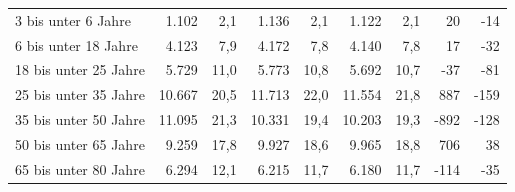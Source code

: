 \documentclass[
  a4paper,
  twoside]{article}
\begin{document}
\begin{table}[!h]
{\begin{threeparttable}
\begin{tabular}[t]{>{}l>{}r>{}r>{}r>{}r>{}r>{}r>{}r>{}r}
\hspace{1em}\hspace{1em}\textcolor{DoGray}{3 bis unter 6 Jahre} & \textcolor{DoGray}{1.102} & \textcolor{DoGray}{2,1} & \textcolor{DoGray}{1.136} & \textcolor{DoGray}{2,1} & \textcolor{DoGray}{1.122} & \textcolor{DoGray}{2,1} & \textcolor{DoGray}{20} & \textcolor{DoGray}{-14}\\
\hspace{1em}\hspace{1em}\textcolor{DoGray}{6 bis unter 18 Jahre} & \textcolor{DoGray}{4.123} & \textcolor{DoGray}{7,9} & \textcolor{DoGray}{4.172} & \textcolor{DoGray}{7,8} & \textcolor{DoGray}{4.140} & \textcolor{DoGray}{7,8} & \textcolor{DoGray}{17} & \textcolor{DoGray}{-32}\\
\hspace{1em}\hspace{1em}\textcolor{DoGray}{18 bis unter 25 Jahre} & \textcolor{DoGray}{5.729} & \textcolor{DoGray}{11,0} & \textcolor{DoGray}{5.773} & \textcolor{DoGray}{10,8} & \textcolor{DoGray}{5.692} & \textcolor{DoGray}{10,7} & \textcolor{DoGray}{-37} & \textcolor{DoGray}{-81}\\
\hspace{1em}\hspace{1em}\textcolor{DoGray}{25 bis unter 35 Jahre} & \textcolor{DoGray}{10.667} & \textcolor{DoGray}{20,5} & \textcolor{DoGray}{11.713} & \textcolor{DoGray}{22,0} & \textcolor{DoGray}{11.554} & \textcolor{DoGray}{21,8} & \textcolor{DoGray}{887} & \textcolor{DoGray}{-159}\\
\hspace{1em}\hspace{1em}\textcolor{DoGray}{35 bis unter 50 Jahre} & \textcolor{DoGray}{11.095} & \textcolor{DoGray}{21,3} & \textcolor{DoGray}{10.331} & \textcolor{DoGray}{19,4} & \textcolor{DoGray}{10.203} & \textcolor{DoGray}{19,3} & \textcolor{DoGray}{-892} & \textcolor{DoGray}{-128}\\
\hspace{1em}\hspace{1em}\textcolor{DoGray}{50 bis unter 65 Jahre} & \textcolor{DoGray}{9.259} & \textcolor{DoGray}{17,8} & \textcolor{DoGray}{9.927} & \textcolor{DoGray}{18,6} & \textcolor{DoGray}{9.965} & \textcolor{DoGray}{18,8} & \textcolor{DoGray}{706} & \textcolor{DoGray}{38}\\
\hspace{1em}\hspace{1em}\textcolor{DoGray}{65 bis unter 80 Jahre} & \textcolor{DoGray}{6.294} & \textcolor{DoGray}{12,1} & \textcolor{DoGray}{6.215} & \textcolor{DoGray}{11,7} & \textcolor{DoGray}{6.180} & \textcolor{DoGray}{11,7} & \textcolor{DoGray}{-114} & \textcolor{DoGray}{-35}\\

\end{tabular}
\end{threeparttable}}
\end{table}
\end{document}
